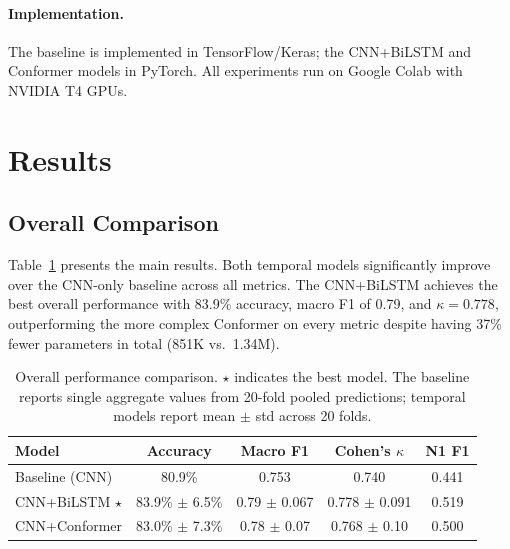 \documentclass[final]{article}
\begin{document}
\paragraph{Implementation.}
The baseline is implemented in TensorFlow/Keras; the CNN+BiLSTM and Conformer models in PyTorch. All experiments run on Google Colab with NVIDIA T4 GPUs.

\section{Results}

\subsection{Overall Comparison}

Table~\ref{tab:main_results} presents the main results. Both temporal models significantly improve over the CNN-only baseline across all metrics. The CNN+BiLSTM achieves the best overall performance with 83.9\% accuracy, macro F1 of 0.79, and $\kappa = 0.778$, outperforming the more complex Conformer on every metric despite having 37\% fewer parameters in total (851K vs.\ 1.34M).

\begin{table}[t]
\caption{Overall performance comparison. $\star$ indicates the best model. The baseline reports single aggregate values from 20-fold pooled predictions; temporal models report mean $\pm$ std across 20 folds.}
\label{tab:main_results}
\centering
\small
\begin{tabular}{lcccc}
\toprule
\textbf{Model} & \textbf{Accuracy} & \textbf{Macro F1} & \textbf{Cohen's $\kappa$} & \textbf{N1 F1} \\
\midrule
Baseline (CNN)           & 80.9\%                  & 0.753              & 0.740               & 0.441 \\
CNN+BiLSTM $\star$       & 83.9\% $\pm$ 6.5\%     & 0.79 $\pm$ 0.067   & 0.778 $\pm$ 0.091   & 0.519 \\
CNN+Conformer            & 83.0\% $\pm$ 7.3\%     & 0.78 $\pm$ 0.07    & 0.768 $\pm$ 0.10    & 0.500 \\
\bottomrule
\end{tabular}
\end{table}
\end{document}
